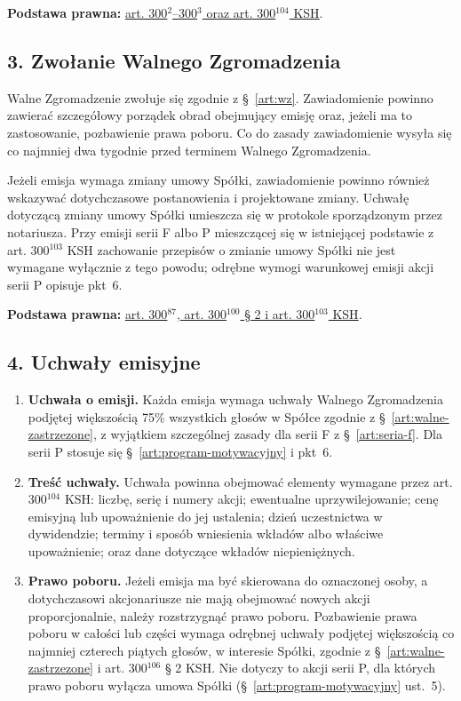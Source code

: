 \documentclass[12pt,a4paper]{report}
\begin{document}
\textbf{Podstawa prawna:} \href{https://eli.gov.pl/api/acts/DU/2024/18/text.html}{art. 300$^{2}$--300$^{3}$ oraz art. 300$^{104}$ KSH}.

\subsection*{3. Zwołanie Walnego Zgromadzenia}

Walne Zgromadzenie zwołuje się zgodnie z §~\ref{art:wz}. Zawiadomienie powinno zawierać szczegółowy porządek obrad obejmujący emisję oraz, jeżeli ma to zastosowanie, pozbawienie prawa poboru. Co do zasady zawiadomienie wysyła się co najmniej dwa tygodnie przed terminem Walnego Zgromadzenia.

Jeżeli emisja wymaga zmiany umowy Spółki, zawiadomienie powinno również wskazywać dotychczasowe postanowienia i projektowane zmiany. Uchwałę dotyczącą zmiany umowy Spółki umieszcza się w protokole sporządzonym przez notariusza. Przy emisji serii F albo P mieszczącej się w istniejącej podstawie z art. 300$^{103}$ KSH zachowanie przepisów o zmianie umowy Spółki nie jest wymagane wyłącznie z tego powodu; odrębne wymogi warunkowej emisji akcji serii P opisuje pkt~6.

\textbf{Podstawa prawna:} \href{https://eli.gov.pl/api/acts/DU/2024/18/text.html}{art. 300$^{87}$, art. 300$^{100}$ § 2 i art. 300$^{103}$ KSH}.

\subsection*{4. Uchwały emisyjne}

\begin{enumerate}
  \item \textbf{Uchwała o emisji.} Każda emisja wymaga uchwały Walnego Zgromadzenia podjętej większością 75\% wszystkich głosów w Spółce zgodnie z §~\ref{art:walne-zastrzezone}, z wyjątkiem szczególnej zasady dla serii F z §~\ref{art:seria-f}. Dla serii P stosuje się §~\ref{art:program-motywacyjny} i pkt~6.
  \item \textbf{Treść uchwały.} Uchwała powinna obejmować elementy wymagane przez art. 300$^{104}$ KSH: liczbę, serię i numery akcji; ewentualne uprzywilejowanie; cenę emisyjną lub upoważnienie do jej ustalenia; dzień uczestnictwa w dywidendzie; terminy i sposób wniesienia wkładów albo właściwe upoważnienie; oraz dane dotyczące wkładów niepieniężnych.
  \item \textbf{Prawo poboru.} Jeżeli emisja ma być skierowana do oznaczonej osoby, a dotychczasowi akcjonariusze nie mają obejmować nowych akcji proporcjonalnie, należy rozstrzygnąć prawo poboru. Pozbawienie prawa poboru w całości lub części wymaga odrębnej uchwały podjętej większością co najmniej czterech piątych głosów, w interesie Spółki, zgodnie z §~\ref{art:walne-zastrzezone} i art. 300$^{106}$ § 2 KSH. Nie dotyczy to akcji serii P, dla których prawo poboru wyłącza umowa Spółki (§~\ref{art:program-motywacyjny} ust.~5).
\end{enumerate}
\end{document}
